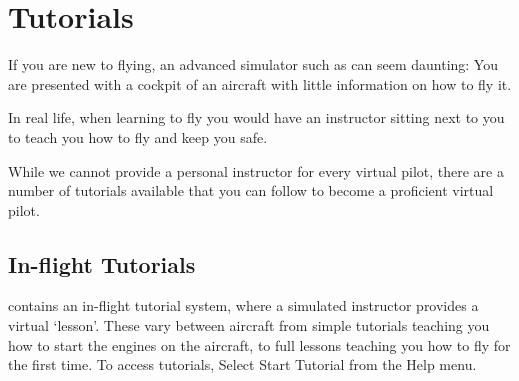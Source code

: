 
\chapter{Tutorials\label{tutorials}}

If you are new to flying, an advanced simulator such as \FlightGear{} can seem
daunting: You are presented with a cockpit of an aircraft with little 
information on how to fly it.

In real life, when learning to fly you would have an instructor sitting next to
you to teach you how to fly and keep you safe.

While we cannot provide a personal instructor for every virtual pilot, there are
a number of tutorials available that you can follow to become a proficient
virtual pilot.

\section{In-flight Tutorials}

\FlightGear{} contains an in-flight tutorial system, where a simulated 
instructor provides a virtual `lesson'. These vary between aircraft from
 simple tutorials teaching you how to start the engines on the aircraft,
to full lessons teaching you how to fly for the first time.
To access tutorials, Select Start Tutorial from the Help menu. 

